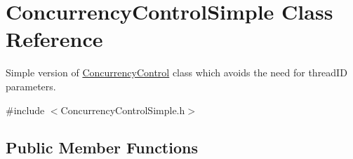 \hypertarget{class_concurrency_control_simple}{
\section{ConcurrencyControlSimple Class Reference}
\label{class_concurrency_control_simple}
}


Simple version of \hyperlink{class_concurrency_control}{ConcurrencyControl} class which avoids the need for threadID parameters.  




{\ttfamily \#include $<$ConcurrencyControlSimple.h$>$}

\subsection*{Public Member Functions}
